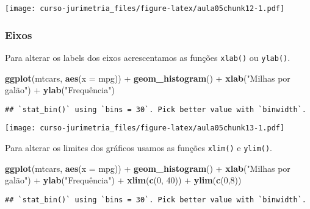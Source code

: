 \documentclass[]{book}
\newenvironment{Shaded}{\begin{snugshade}}{\end{snugshade}}
\newcommand{\KeywordTok}[1]{\textcolor[rgb]{0.13,0.29,0.53}{\textbf{{#1}}}}
\newcommand{\DataTypeTok}[1]{\textcolor[rgb]{0.13,0.29,0.53}{{#1}}}
\newcommand{\DecValTok}[1]{\textcolor[rgb]{0.00,0.00,0.81}{{#1}}}
\newcommand{\StringTok}[1]{\textcolor[rgb]{0.31,0.60,0.02}{{#1}}}
\newcommand{\NormalTok}[1]{{#1}}
\begin{document}
\texttt{[image: curso-jurimetria\_files/figure-latex/aula05chunk12-1.pdf]}

\subsubsection{Eixos}\label{eixos}

Para alterar os labels dos eixos acrescentamos as funções
\texttt{xlab()} ou \texttt{ylab()}.

\begin{Shaded}
\begin{Highlighting}[]
\KeywordTok{ggplot}\NormalTok{(mtcars, }\KeywordTok{aes}\NormalTok{(}\DataTypeTok{x =} \NormalTok{mpg)) +}\StringTok{ }
\StringTok{  }\KeywordTok{geom_histogram}\NormalTok{() +}
\StringTok{  }\KeywordTok{xlab}\NormalTok{(}\StringTok{"Milhas por galão"}\NormalTok{) +}
\StringTok{  }\KeywordTok{ylab}\NormalTok{(}\StringTok{"Frequência"}\NormalTok{)}
\end{Highlighting}
\end{Shaded}

\begin{verbatim}
## `stat_bin()` using `bins = 30`. Pick better value with `binwidth`.
\end{verbatim}

\texttt{[image: curso-jurimetria\_files/figure-latex/aula05chunk13-1.pdf]}

Para alterar os limites dos gráficos usamos as funções \texttt{xlim()} e
\texttt{ylim()}.

\begin{Shaded}
\begin{Highlighting}[]
\KeywordTok{ggplot}\NormalTok{(mtcars, }\KeywordTok{aes}\NormalTok{(}\DataTypeTok{x =} \NormalTok{mpg)) +}\StringTok{ }
\StringTok{  }\KeywordTok{geom_histogram}\NormalTok{() +}
\StringTok{  }\KeywordTok{xlab}\NormalTok{(}\StringTok{"Milhas por galão"}\NormalTok{) +}
\StringTok{  }\KeywordTok{ylab}\NormalTok{(}\StringTok{"Frequência"}\NormalTok{) +}
\StringTok{  }\KeywordTok{xlim}\NormalTok{(}\KeywordTok{c}\NormalTok{(}\DecValTok{0}\NormalTok{, }\DecValTok{40}\NormalTok{)) +}
\StringTok{  }\KeywordTok{ylim}\NormalTok{(}\KeywordTok{c}\NormalTok{(}\DecValTok{0}\NormalTok{,}\DecValTok{8}\NormalTok{))}
\end{Highlighting}
\end{Shaded}

\begin{verbatim}
## `stat_bin()` using `bins = 30`. Pick better value with `binwidth`.
\end{verbatim}
\end{document}
